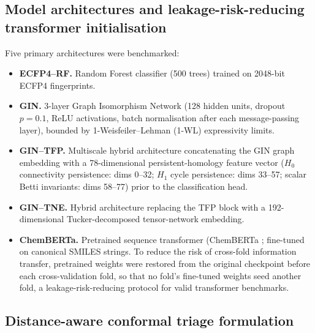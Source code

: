 \documentclass[11pt,a4paper]{article}
\begin{document}
\subsection{Model architectures and leakage-risk-reducing transformer initialisation}

Five primary architectures were benchmarked:
\begin{itemize}[leftmargin=*]
    \item \textbf{ECFP4--RF.} Random Forest classifier (\num{500} trees) trained on \num{2048}-bit ECFP4 fingerprints.
    \item \textbf{GIN.} \num{3}-layer Graph Isomorphism Network (\num{128} hidden units, dropout $p=\num{0.1}$, ReLU activations, batch normalisation after each message-passing layer), bounded by 1-Weisfeiler--Lehman (1-WL) expressivity limits.
    \item \textbf{GIN--TFP.} Multiscale hybrid architecture concatenating the GIN graph embedding with a \num{78}-dimensional persistent-homology feature vector ($H_0$ connectivity persistence: dims \numrange{0}{32}; $H_1$ cycle persistence: dims \numrange{33}{57}; scalar Betti invariants: dims \numrange{58}{77}) prior to the classification head.
    \item \textbf{GIN--TNE.} Hybrid architecture replacing the TFP block with a \num{192}-dimensional Tucker-decomposed tensor-network embedding.
    \item \textbf{ChemBERTa.} Pretrained sequence transformer (ChemBERTa \citep{chemberta_2020}; fine-tuned on canonical SMILES strings. To reduce the risk of cross-fold information transfer, pretrained weights were restored from the original checkpoint before each cross-validation fold, so that no fold's fine-tuned weights seed another fold, a leakage-risk-reducing protocol for valid transformer benchmarks.
\end{itemize}

\subsection{Distance-aware conformal triage formulation}
\end{document}
